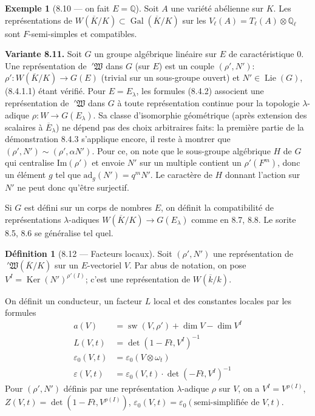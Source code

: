 \documentclass[11pt]{amsart}
\theoremstyle{plain}
\theoremstyle{definition}
\newtheorem{definition}[theorem]{D\'efinition}
\newtheorem{example}[theorem]{Exemple}
\DeclareMathOperator{\Gal}{Gal}
\DeclareMathOperator{\Ker}{Ker}
\DeclareMathOperator{\Lie}{Lie}
\DeclareMathOperator{\sw}{sw}
\begin{document}
\begin{example}[8.10 --- on fait $E = \mathbb{Q}$]
Soit $A$ une vari\'et\'e ab\'elienne sur $K$. Les repr\'esentations de $W(\overline{K}/K) \subset \Gal(\overline{K}/K)$ sur les $V_\ell(A) = T_\ell(A) \otimes \mathbb{Q}_\ell$ sont $F$-semi-simples et compatibles.
\end{example}

\textbf{Variante 8.11.} Soit $G$ un groupe alg\'ebrique lin\'eaire sur $E$ de caract\'eristique 0. Une repr\'esentation de $\ '\mathfrak{W}$ dans $G$ (sur $E$) est un couple $(\rho',N')$: $\rho': W(\overline{K}/K) \to G(E)$ (trivial sur un sous-groupe ouvert) et $N' \in \Lie(G)$, (8.4.1.1) \'etant v\'erifi\'e. Pour $E = E_\lambda$, les formules (8.4.2) associent une repr\'esentation de $\ '\mathfrak{W}$ dans $G$ \`a toute repr\'esentation continue pour la topologie $\lambda$-adique $\rho: W \to G(E_\lambda)$. Sa classe d'isomorphie g\'eom\'etrique (apr\`es extension des scalaires \`a $\overline{E}_\lambda$) ne d\'epend pas des choix arbitraires faits: la premi\`ere partie de la d\'emonstration 8.4.3 s'applique encore, il reste \`a montrer que $(\rho',N') \sim (\rho',\alpha N')$. Pour ce, on note que le sous-groupe alg\'ebrique $H$ de $G$ qui centralise $\mathrm{Im}(\rho')$ et envoie $N'$ sur un multiple contient un $\rho'(F^m)$, donc un \'el\'ement $g$ tel que $\mathrm{ad}_g(N') = q^m N'$. Le caract\`ere de $H$ donnant l'action sur $N'$ ne peut donc qu'\^etre surjectif.

Si $G$ est d\'efini sur un corps de nombres $E$, on d\'efinit la compatibilit\'e de repr\'esentations $\lambda$-adiques $W(\overline{K}/K) \to G(E_\lambda)$ comme en 8.7, 8.8. Le sorite 8.5, 8.6 se g\'en\'eralise tel quel.

\begin{definition}[8.12 --- Facteurs locaux]
Soit $(\rho',N')$ une repr\'esentation de $\ '\mathfrak{W}(\overline{K}/K)$ sur un $E$-vectoriel $V$. Par abus de notation, on pose $V^I = \Ker(N')^{\rho'(I)}$; c'est une repr\'esentation de $W(\overline{k}/k)$.

On d\'efinit un conducteur, un facteur $L$ local et des constantes locales par les formules
\begin{align}
a(V) &= \sw(V,\rho') + \dim V - \dim V^I \tag{8.12.1}\\
L(V,t) &= \det(1-Ft,V^I)^{-1} \tag{8.12.2}\\
\varepsilon_0(V,t) &= \varepsilon_0(V \otimes \omega_t) \tag{8.12.3}\\
\varepsilon(V,t) &= \varepsilon_0(V,t) \cdot \det(-Ft,V^I)^{-1} \tag{8.12.4}
\end{align}
Pour $(\rho',N')$ d\'efinis par une repr\'esentation $\lambda$-adique $\rho$ sur $V$, on a $V^I = V^{\rho(I)}$, $Z(V,t) = \det(1-Ft,V^{\rho(I)})$, $\varepsilon_0(V,t) = \varepsilon_0(\text{semi-simplifi\'ee de }V,t)$.
\end{definition}
\end{document}

